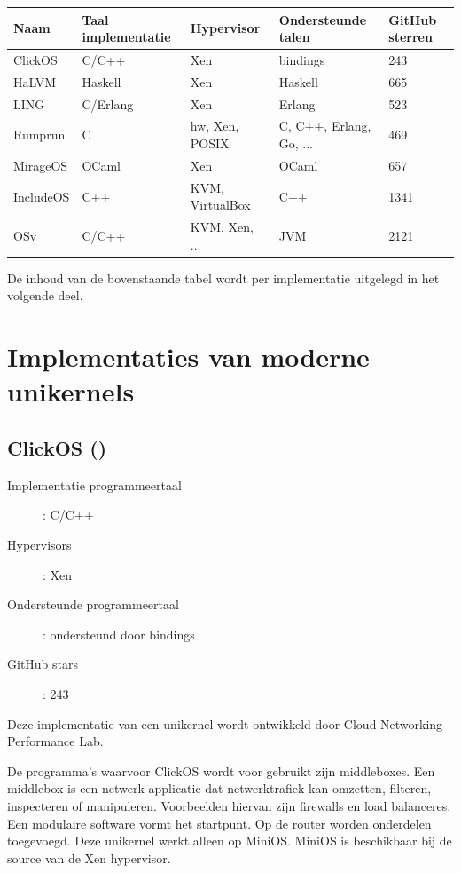 \documentclass[pdftex,a4paper,12pt,twoside]{report}
\begin{document}
{\footnotesize
\begin{center}
    \begin{tabular}{| l | l | l | l | l |}
    \hline
    Naam & Taal implementatie & Hypervisor & Ondersteunde talen & GitHub sterren \\ \hline
    ClickOS & C/C++ & Xen & bindings & 243 \\ \hline
    HaLVM & Haskell & Xen & Haskell & 665 \\ \hline
    LING & C/Erlang & Xen & Erlang & 523 \\ \hline
    Rumprun & C & hw, Xen, POSIX & C, C++, Erlang, Go, ... & 469 \\ \hline
    MirageOS & OCaml & Xen & OCaml & 657 \\ \hline
    IncludeOS & C++ & KVM, VirtualBox & C++ & 1341 \\ \hline
    OSv & C/C++ & KVM, Xen, ... & JVM & 2121 \\ \hline
    \end{tabular}
\end{center} 
}

De inhoud van de bovenstaande tabel wordt per implementatie uitgelegd in het volgende deel.

\newpage

\section{Implementaties van moderne unikernels}

\subsection{ClickOS (\cite{martins_clickos_2014})}
\begin{description}
  \item [Implementatie programmeertaal]: C/C++
  \item [Hypervisors]: Xen
  \item [Ondersteunde programmeertaal]: ondersteund door bindings
  \item [GitHub stars]: 243
\end{description}

Deze implementatie van een unikernel wordt ontwikkeld door Cloud Networking Performance Lab.

De programma's waarvoor ClickOS wordt voor gebruikt zijn middleboxes. Een middlebox is een netwerk applicatie dat netwerktrafiek kan omzetten, filteren, inspecteren of manipuleren. Voorbeelden hiervan zijn firewalls en load balanceres.
Een modulaire software vormt het startpunt. Op de router worden onderdelen toegevoegd. Deze unikernel werkt alleen op MiniOS. MiniOS is beschikbaar bij de source van de Xen hypervisor.
\end{document}
